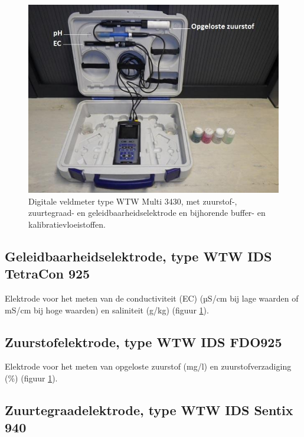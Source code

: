 \documentclass[
]{scrreprt}
\begin{document}
\begin{figure}
\includegraphics[width=1\linewidth]{./media/image1} \caption{Digitale veldmeter type WTW Multi 3430, met zuurstof-, zuurtegraad- en geleidbaarheidselektrode en bijhorende buffer- en kalibratievloeistoffen.}\label{fig:Figuur1}
\end{figure}

\hypertarget{geleidbaarheidselektrode-type-wtw-ids-tetracon-925}{%
\subsection{Geleidbaarheidselektrode, type WTW IDS TetraCon 925}\label{geleidbaarheidselektrode-type-wtw-ids-tetracon-925}}

Elektrode voor het meten van de conductiviteit (EC) (µS/cm bij lage waarden of mS/cm bij hoge waarden) en saliniteit (g/kg) (figuur \ref{fig:Figuur1}).

\hypertarget{zuurstofelektrode-type-wtw-ids-fdo925}{%
\subsection{Zuurstofelektrode, type WTW IDS FDO925}\label{zuurstofelektrode-type-wtw-ids-fdo925}}

Elektrode voor het meten van opgeloste zuurstof (mg/l) en zuurstofverzadiging (\%) (figuur \ref{fig:Figuur1}).

\hypertarget{zuurtegraadelektrode-type-wtw-ids-sentix-940}{%
\subsection{Zuurtegraadelektrode, type WTW IDS Sentix 940}\label{zuurtegraadelektrode-type-wtw-ids-sentix-940}}
\end{document}
